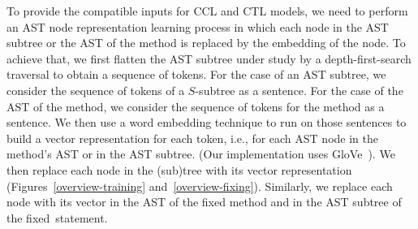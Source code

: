 

To provide the compatible inputs for CCL and CTL models, we need to
perform an AST node representation learning process in which each node
in the AST subtree or the AST of the method is replaced by the
embedding of the node. To achieve that, we first flatten the AST
subtree under study by a depth-first-search traversal to obtain a
sequence of tokens. For the case of an AST subtree, we consider the
sequence of tokens of a $S$-subtree as a sentence. For the case of the
AST of the method, we consider the sequence of tokens for the method
as a sentence. We then use a word embedding technique
to run on those sentences to build a vector representation for each
token, i.e., for each AST node in the method's AST or in the AST
subtree. (Our implementation uses GloVe~\cite{pennington2014glove}).
We then replace each node in the (sub)tree with its vector
representation (Figures~\ref{overview-training}
and~\ref{overview-fixing}). Similarly, we replace each node with its
vector in the AST of the fixed method and in the AST subtree of the
fixed~statement.


